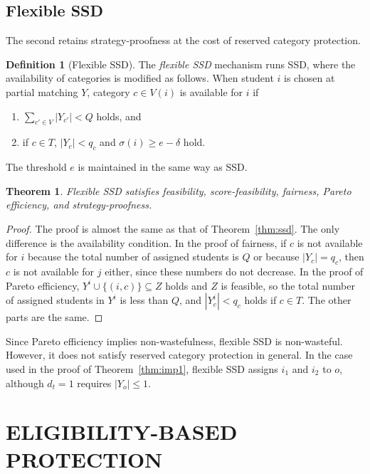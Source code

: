 \documentclass[a4paper,twoside]{article}
\newtheorem{theorem}{Theorem}
\theoremstyle{definition}
\newtheorem{definition}{Definition}
\begin{document}
\subsection{Flexible SSD}

The second retains strategy-proofness at the cost of reserved category protection.

\begin{definition}[Flexible SSD]
\label{def:flexssd}
The \emph{flexible SSD} mechanism runs SSD, where the availability of categories is
modified as follows.
When student $i$ is chosen at partial matching $Y$, category $c\in V(i)$ is available
for $i$ if
\begin{enumerate}
\item $\sum_{c'\in V}|Y_{c'}|<Q$ holds, and
\item if $c\in T$, $|Y_c|<q_c$ and $\sigma(i)\ge e-\delta$ hold.
\end{enumerate}
The threshold $e$ is maintained in the same way as SSD.
\end{definition}

\begin{theorem}
\label{thm:flexible}
Flexible SSD satisfies feasibility, score-feasibility, fairness, Pareto efficiency, and
strategy-proofness.
\end{theorem}
\begin{proof}
The proof is almost the same as that of Theorem~\ref{thm:ssd}.
The only difference is the availability condition.
In the proof of fairness, if $c$ is not available for $i$ because the total number of
assigned students is $Q$ or because $|Y_c|=q_c$, then $c$ is not available for $j$
either, since these numbers do not decrease.
In the proof of Pareto efficiency, $Y^i\cup\{(i,c)\}\subseteq Z$ holds and $Z$ is
feasible, so the total number of assigned students in $Y^i$ is less than $Q$, and
$|Y^i_c|<q_c$ holds if $c\in T$.
The other parts are the same.
\end{proof}

Since Pareto efficiency implies non-wastefulness, flexible SSD is non-wasteful.
However, it does not satisfy reserved category protection in general.
In the case used in the proof of Theorem~\ref{thm:imp1}, flexible SSD assigns $i_1$ and
$i_2$ to $o$, although $d_t=1$ requires $|Y_o|\le 1$.

\section{\uppercase{Eligibility-Based Protection}}
\label{sec:eligibility}
\end{document}
